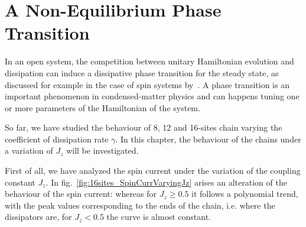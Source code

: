\chapter{A Non-Equilibrium Phase Transition}
\label{chapter5}

In an open system, the competition between unitary Hamiltonian evolution and dissipation can induce a dissipative phase transition for the steady state, as discussed for example in the case of spin systems by~\cite{phase_trans_spin_system}.
A phase transition is an important phenomenon in condensed-matter physics and can happens tuning one or more parameters of the Hamiltonian of the system. 

So far, we have studied the behaviour of 8, 12 and 16-sites chain varying the coefficient of dissipation rate $\gamma$. In this chapter, the behaviour of the chains under a variation of $J_z$ will be investigated.

First of all, we have analyzed the spin current under the variation of the coupling constant $J_z$. In fig.~\ref{fig:16sites_SpinCurrVaryingJz} arises an alteration of the behaviour of the spin current: whereas for $J_z \geq 0.5$ it follows a polynomial trend, with the peak values corresponding to the ends of the chain, i.e. where the dissipators are, for $J_z < 0.5$ the curve is almost constant. 




